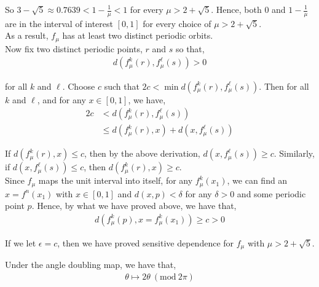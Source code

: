\documentclass[12pt]{article}
\newenvironment{problem}[2][Problem]{\begin{trivlist}
\item[\hskip \labelsep {\bfseries #1}\hskip \labelsep {\bfseries #2.}]}{\end{trivlist}}
\newcommand{\Mod}[1]{\ (\mathrm{mod}\ #1)}
\begin{document}
So $3 - \sqrt{5} \approx 0.7639 < 1 - \frac{1}{\mu} < 1$ for every $\mu > 2 + \sqrt{5}$. Hence, both $0$ and $1 - \frac{1}{\mu}$ are in the interval of interest $[0, 1]$ for every choice of $\mu > 2 + \sqrt{5}$.\\

As a result, $f_{\mu}$ has at least two distinct periodic orbits.\\

Now fix two distinct periodic points, $r$ and $s$ so that,
\begin{align*}
d(f_{\mu}^k(r), f_{\mu}^{\ell}(s)) > 0
\end{align*}

for all $k$ and $\ell$. Choose $c$ such that $2c < \min d(f_{\mu}^k(r), f_{\mu}^{\ell}(s))$. Then for all $k$ and $\ell$, and for any $x \in [0, 1]$, we have,
\begin{align*}
2c &< d(f_{\mu}^k(r), f_{\mu}^{\ell}(s))\\
&\leq d(f_{\mu}^k(r), x) + d(x, f_{\mu}^{\ell}(s))
\end{align*}

If $d(f_{\mu}^k(r), x) \leq c$, then by the above derivation, $d(x, f_{\mu}^{\ell}(s)) \geq c$. Similarly, if $d(x, f_{\mu}^{\ell}(s)) \leq c$, then  $d(f_{\mu}^k(r), x) \geq c$.\\

Since $f_{\mu}$ maps the unit interval into itself, for any $f_{\mu}^k(x_1)$, we can find an $x = f^n(x_1)$ with $x \in [0, 1]$ and $d(x, p) < \delta$ for any $\delta > 0$ and some periodic point $p$. Hence, by what we have proved above, we have that,
\begin{align*}
d(f_{\mu}^k(p), x = f_{\mu}^k(x_1)) \geq c > 0
\end{align*}

If we let $\epsilon = c$, then we have proved sensitive dependence for $f_{\mu}$ with $\mu > 2 + \sqrt{5}$.

\begin{problem}{4}
\end{problem}

Under the angle doubling map, we have that,
\begin{align*}
\theta \mapsto 2\theta \Mod{2\pi}
\end{align*}
\end{document}

